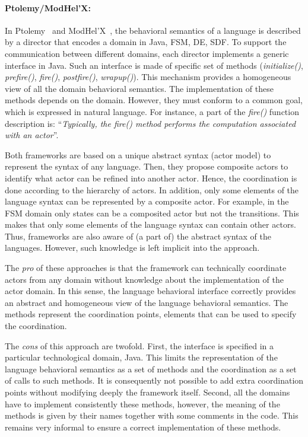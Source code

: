 \paragraph{Ptolemy/ModHel'X: }
In Ptolemy~\cite{ptoleframebib} and ModHel'X~\cite{modhelxbib}, the behavioral semantics of a language is described by a director that encodes a domain in Java, \eg FSM, DE, SDF. To support the communication between different domains, each director implements a generic interface in Java. Such an interface is made of specific set of methods (\eg \emph{initialize()}, \emph{prefire()}, \emph{fire()}, \emph{postfire()}, \emph{wrapup()}). This mechanism provides a homogeneous view of all the domain behavioral semantics. The implementation of these methods depends on the domain. However, they must conform to a common goal, which is expressed in natural language. For instance, a part of the \emph{fire()} function description is: ``\emph{Typically, the fire() method performs the computation associated with an actor}''. 

Both frameworks are based on a unique abstract syntax (\ie actor model) to represent the syntax of any language. Then, they propose composite actors to identify what actor can be refined into another actor. Hence, the coordination is done according to the hierarchy of actors. In addition, only some elements of the language syntax can be represented by a composite actor. For example, in the FSM domain only states can be a composited actor but not the transitions. This makes that only some elements of the language syntax can contain other actors. Thus, frameworks are also aware of (a part of) the abstract syntax of the languages. However, such knowledge is left implicit into the approach.

The \emph{pro} of these approaches is that the framework can technically coordinate actors from any domain without knowledge about the implementation of the actor domain. In this sense, the language behavioral interface correctly provides an abstract and homogeneous view of the language behavioral semantics. The methods represent the coordination points, \ie elements that can be used to specify the coordination. 

The \emph{cons} of this approach are twofold. First, the interface is specified in a particular technological domain, \ie Java. This limits the representation of the language behavioral semantics as a set of methods and the coordination as a set of calls to such methods. It is consequently not possible to add extra coordination points without modifying deeply the framework itself. Second, all the domains have to implement consistently these methods, however, the meaning of the methods is given by their names together with some comments in the code. This remains very informal to ensure a correct implementation of these methods.  

